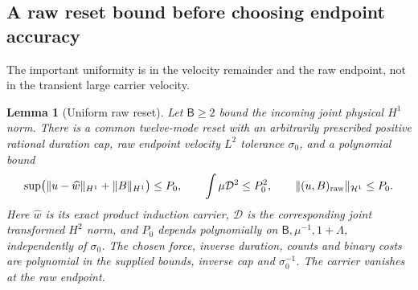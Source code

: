 \documentclass[11pt,a4paper]{amsart}
\newtheorem{lemma}[theorem]{Lemma}
\theoremstyle{definition}
\theoremstyle{remark}
\numberwithin{equation}{section}
\newcommand{\Hcal}{\mathcal H}
\newcommand{\norm}[1]{\lVert #1\rVert}
\begin{document}
\subsection{A raw reset bound before choosing endpoint accuracy}
The important uniformity is in the velocity remainder and the raw endpoint,
not in the transient large carrier velocity.

\begin{lemma}[Uniform raw reset]\label{lem:raw-reset}
Let $\mathsf B\ge2$ bound the incoming joint physical $H^1$ norm.  There
is a common twelve-mode reset with an arbitrarily prescribed positive
rational duration cap, raw endpoint velocity $L^2$ tolerance $\sigma_0$,
and a polynomial bound
\begin{equation}\label{eq:raw-bound}
 \sup\bigl(\norm{u-\widehat w}_{H^1}+\norm B_{H^1}\bigr)
       \le P_0,\qquad
 \int\mu\mathcal D^2\le P_0^2,
 \qquad \norm{(u,B)_{\rm raw}}_{\Hcal^1}\le P_0.
\end{equation}
Here $\widehat w$ is its exact product induction carrier, $\mathcal D$
is the corresponding joint transformed $H^2$ norm, and $P_0$ depends
polynomially on $\mathsf B,\mu^{-1},1+\Lambda$, independently of
$\sigma_0$.  The chosen force, inverse duration, counts and binary costs
are polynomial in the supplied bounds, inverse cap and $\sigma_0^{-1}$.
The carrier vanishes at the raw endpoint.
\end{lemma}
\end{document}
